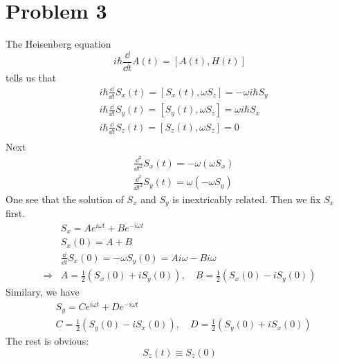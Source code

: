 \documentclass{article}
\begin{document}
\section*{Problem 3}
The Heisenberg equation
\begin{equation*}
    i\hbar \frac{\dd }{\dd t}A(t) = [A(t),H(t)]
\end{equation*}
tells us that
\begin{align*}
    &i\hbar \frac{\dd}{\dd t} S_x(t) = [S_x(t),\omega S_z]
    = -\omega i\hbar S_y \\
    &i\hbar \frac{\dd}{\dd t} S_y(t) = [S_y(t),\omega S_z]
    = \omega i\hbar S_x \\
    &i\hbar \frac{\dd}{\dd t} S_z(t) = [S_z(t),\omega S_z] = 0 \\
\end{align*}
Next
\begin{align*}
    &\frac{\dd^2}{\dd t^2}S_x(t) = -\omega (\omega S_x) \\
    &\frac{\dd^2}{\dd t^2}S_y(t) = \omega (-\omega S_y)
\end{align*}
One see that the solution of $S_x$ and $S_y$ is inextricably related.
Then we fix $S_x$ first.
\begin{align}
    &S_x = A e^{i\omega t} + Be^{-i\omega t} \\
    &S_x(0) = A+B \nonumber\\
    &\frac{\dd}{\dd t}S_x(0) = -\omega S_y(0) = Ai\omega- Bi\omega
    \nonumber\\
    \Rightarrow
    &A = \frac{1}{2}(S_x(0)+iS_y(0)),\quad B=\frac{1}{2}(S_x(0)-iS_y(0))
\end{align}
Similary, we have
\begin{align}
    &S_y = C e^{i\omega t} + De^{-i\omega t} \nonumber\\
    &C = \frac{1}{2}(S_y(0)-iS_x(0)),\quad D=\frac{1}{2}(S_y(0)+iS_x(0))
\end{align}
The rest is obvious:
\begin{equation}
S_z(t)\equiv S_z(0)
\end{equation}
\end{document}
